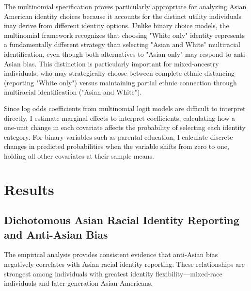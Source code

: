 The multinomial specification proves particularly appropriate for analyzing Asian American identity choices because it accounts for the distinct utility individuals may derive from different identity options. Unlike binary choice models, the multinomial framework recognizes that choosing "White only" identity represents a fundamentally different strategy than selecting "Asian and White" multiracial identification, even though both alternatives to "Asian only" may respond to anti-Asian bias. This distinction is particularly important for mixed-ancestry individuals, who may strategically choose between complete ethnic distancing (reporting "White only") versus maintaining partial ethnic connection through multiracial identification ("Asian and White").

Since log odds coefficients from multinomial logit models are difficult to interpret directly, I estimate marginal effects to interpret coefficients, calculating how a one-unit change in each covariate affects the probability of selecting each identity category. For binary variables such as parental education, I calculate discrete changes in predicted probabilities when the variable shifts from zero to one, holding all other covariates at their sample means.

\section{Results}\label{sec:results}

\subsection*{Dichotomous Asian Racial Identity Reporting and Anti-Asian Bias}

The empirical analysis provides consistent evidence that anti-Asian bias negatively correlates with Asian racial identity reporting. These relationships are strongest among individuals with greatest identity flexibility—mixed-race individuals and later-generation Asian Americans.

